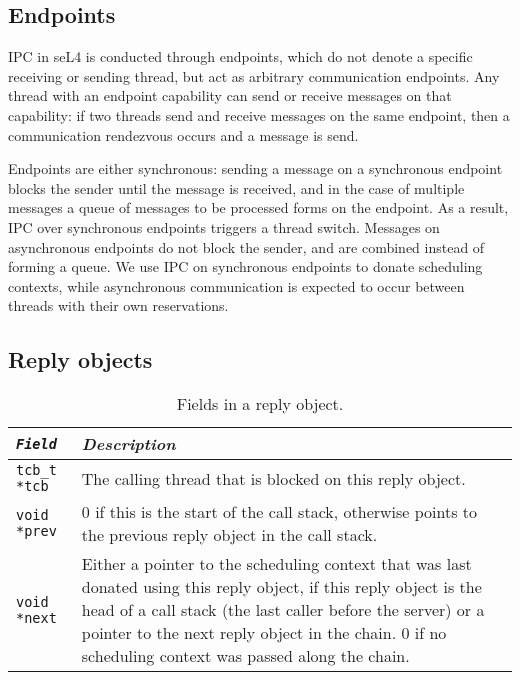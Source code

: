 \subsection{Endpoints}

\Gls{IPC} in seL4 is conducted through endpoints, which do not denote a specific receiving or sending thread, but act as arbitrary communication endpoints.
Any thread with an endpoint capability can send or receive messages on that capability: if two threads send and receive messages on the same endpoint, then a communication rendezvous occurs and a message is send.

Endpoints are either synchronous: sending a message on a synchronous endpoint blocks the sender until the message is received, and in the case of multiple messages a queue of messages to be processed forms on the endpoint.
As a result, IPC over synchronous endpoints triggers a thread switch.
Messages on asynchronous endpoints do not block the sender, and are combined instead of forming a queue.
We use IPC on synchronous endpoints to donate scheduling contexts, while asynchronous communication is expected to occur between threads with their own reservations.

\subsection{Reply objects}


\begin{table}
    \centering
    \begin{tabular}{>{\texttt\bgroup}l<{\egroup}  p{10cm} } \toprule
        \textnormal{\emph{Field}} & \emph{Description} \\\midrule
         tcb\_t *tcb    & The calling thread that is blocked on this reply object. \\
         void *prev & 0 if this is the start of the call stack, otherwise points to the previous
        reply object in the call stack. \\
         void *next & Either a pointer to the scheduling context that was last donated using this
        reply object, if this reply object is the head of a call stack (the last caller before the
        server) or a pointer to the next reply object in the chain. 0 if no scheduling context was
        passed along the chain.\\\bottomrule
    \end{tabular}
    \caption{Fields in a reply object.}
    \label{tab:reply_object}
\end{table}



